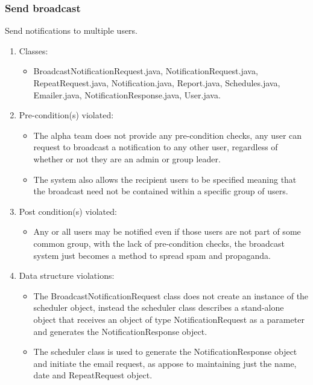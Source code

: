 \subsubsection*{Send broadcast}
Send notifications to multiple users.
	\begin{enumerate}
		\item Classes: 
			\begin{itemize}
				\item BroadcastNotificationRequest.java, NotificationRequest.java, RepeatRequest.java, Notification.java, 								Report.java, Schedules.java, Emailer.java, NotificationResponse.java, User.java.
			\end{itemize}
		\item Pre-condition(s) violated: 
			\begin{itemize}
				\item The alpha team does not provide any pre-condition checks, any user can request to broadcast a notification 						to any other user, regardless of whether or not they are an admin or group leader.
				\item The system also allows the recipient users to be specified meaning that the broadcast need not be contained 					within a specific group of users.
			\end{itemize}
		\item Post condition(s) violated: 
			\begin{itemize}
				\item Any or all users may be notified even if those users are not part of some common group, with the lack of 							pre-condition checks, the broadcast system just becomes a method to spread spam and propaganda.
			\end{itemize}
		\item Data structure violations:
			\begin{itemize}
				\item The BroadcastNotificationRequest class does not create an instance of the scheduler object, instead the 							scheduler class describes a stand-alone object that receives an object of type NotificationRequest as a 							parameter and generates the NotificationResponse object.
				\item The scheduler class is used to generate the NotificationResponse object and initiate the email request, as 						appose to maintaining just the name, date and RepeatRequest object. 
			\end{itemize}
\end{enumerate}
\newpage

